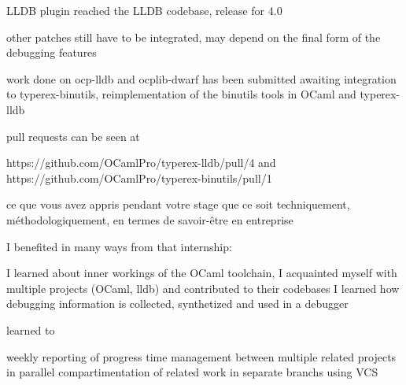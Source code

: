 LLDB plugin reached the LLDB codebase,
release for 4.0

other patches still have to be integrated, may depend on the final form of the
debugging features

work done on ocp-lldb and ocplib-dwarf has been submitted
awaiting integration to typerex-binutils, reimplementation of the binutils tools
in OCaml and typerex-lldb

pull requests can be seen at

https://github.com/OCamlPro/typerex-lldb/pull/4
and
https://github.com/OCamlPro/typerex-binutils/pull/1



ce que vous avez appris pendant votre stage que ce soit techniquement, méthodologiquement,
en termes de savoir-être en entreprise

I benefited in many ways from that internship:

I learned about inner workings of the OCaml toolchain,
I acquainted myself with multiple projects (OCaml, lldb) and contributed to their
codebases
I learned how debugging information is collected, synthetized and used in a debugger

learned to

weekly reporting of progress
time management between multiple related projects in parallel
compartimentation of related work in separate branchs using VCS
